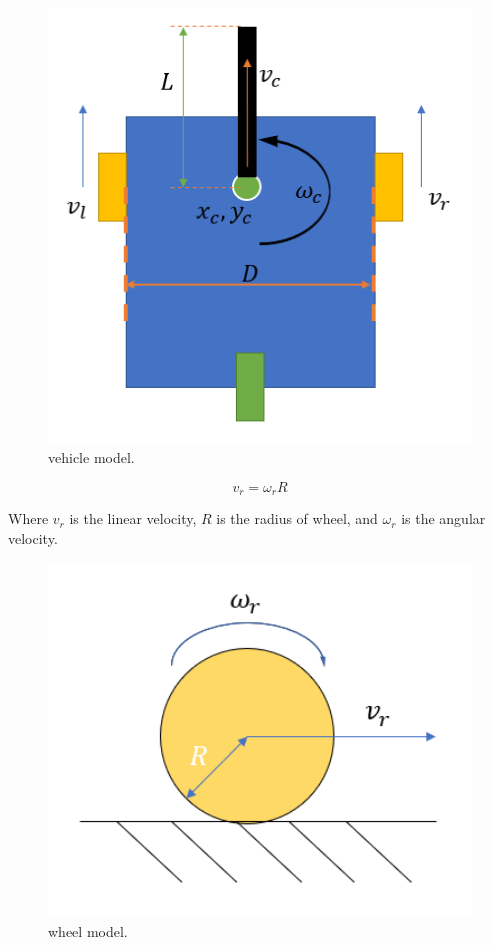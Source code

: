 \begin{figure}[thb]
    \centering
    \includegraphics[width=1\textwidth]{images/vehicle_model.png}
    \caption[vehicle model]{vehicle model.}\label{intro}
\end{figure}

$$ v_r = \omega_r R $$

Where $v_r$ is the linear velocity, $R$ is the radius of wheel, and $\omega_r$ is the angular velocity.

\begin{figure}[thb]
    \centering
    \includegraphics[width=1\textwidth]{images/wheel_model.png}
    \caption[wheel model]{wheel model.}\label{intro}
\end{figure}

